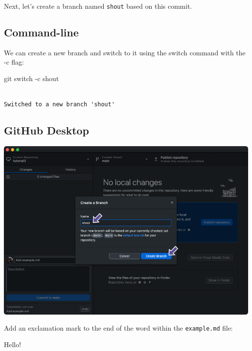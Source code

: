 \documentclass[
  letterpaper,
  DIV=11,
  numbers=noendperiod]{scrartcl}
\newenvironment{Shaded}{\begin{snugshade}}{\end{snugshade}}
\newcommand{\AttributeTok}[1]{\textcolor[rgb]{0.40,0.45,0.13}{#1}}
\newcommand{\FunctionTok}[1]{\textcolor[rgb]{0.28,0.35,0.67}{#1}}
\newcommand{\NormalTok}[1]{\textcolor[rgb]{0.00,0.23,0.31}{#1}}
\begin{document}
Next, let's create a branch named \texttt{shout} based on this commit.

\subsection{Command-line}

We can create a new branch and switch to it using the switch command
with the -c flag:

\begin{Shaded}
\begin{Highlighting}[]
\FunctionTok{git}\NormalTok{ switch }\AttributeTok{{-}c}\NormalTok{ shout}
\end{Highlighting}
\end{Shaded}

\begin{verbatim}

Switched to a new branch 'shout'
\end{verbatim}

\subsection{GitHub Desktop}

\includegraphics{images/image29.png}

Add an exclamation mark to the end of the word within the
\texttt{example.md} file:

\begin{tcolorbox}[enhanced jigsaw, rightrule=.15mm, opacitybacktitle=0.6, bottomtitle=1mm, colbacktitle=quarto-callout-note-color!10!white, toprule=.15mm, title=\textcolor{quarto-callout-note-color}{\faInfo}\hspace{0.5em}{example.md}, toptitle=1mm, left=2mm, leftrule=.75mm, titlerule=0mm, bottomrule=.15mm, colframe=quarto-callout-note-color-frame, arc=.35mm, coltitle=black, breakable, colback=white, opacityback=0]

Hello!

\end{tcolorbox}
\end{document}
